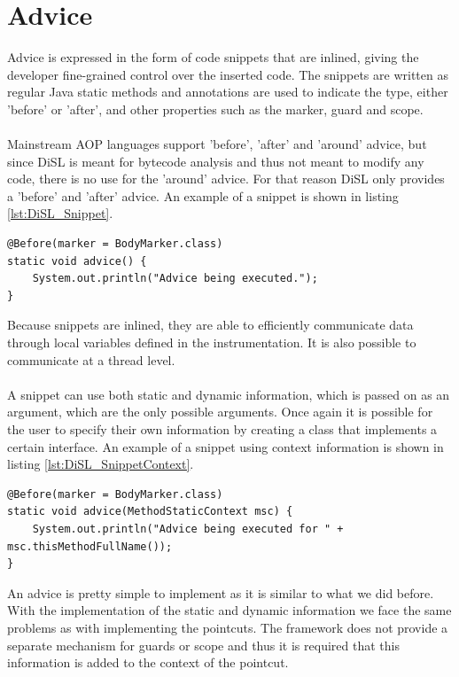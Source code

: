 \documentclass[a4paper]{report}
\begin{document}
\section{Advice}
Advice is expressed in the form of code snippets that are inlined, giving the developer fine-grained control over the inserted code. The snippets are written as regular Java static methods and annotations are used to indicate the type, either 'before' or 'after', and other properties such as the marker, guard and scope.\\
\\
Mainstream AOP languages support 'before', 'after' and 'around' advice, but since DiSL is meant for bytecode analysis and thus not meant to modify any code, there is no use for the 'around' advice. For that reason DiSL only provides a 'before' and 'after' advice. An example of a snippet is shown in listing \ref{lst:DiSL_Snippet}.\\
\begin{lstlisting}[caption=Example of a snippet.,label=lst:DiSL_Snippet]
@Before(marker = BodyMarker.class)
static void advice() {
	System.out.println("Advice being executed.");
}
\end{lstlisting}
Because snippets are inlined, they are able to efficiently communicate data through local variables defined in the instrumentation. It is also possible to communicate at a thread level.\\
\\
A snippet can use both static and dynamic information, which is passed on as an argument, which are the only possible arguments. Once again it is possible for the user to specify their own information by creating a class that implements a certain interface. An example of a snippet using context information is shown in listing \ref{lst:DiSL_SnippetContext}.
\begin{lstlisting}[caption=Example of a snippet using context information.,label=lst:DiSL_SnippetContext]
@Before(marker = BodyMarker.class)
static void advice(MethodStaticContext msc) {
	System.out.println("Advice being executed for " + msc.thisMethodFullName());
}
\end{lstlisting}
An advice is pretty simple to implement as it is similar to what we did before. With the implementation of the static and dynamic information we face the same problems as with implementing the pointcuts. The framework does not provide a separate mechanism for guards or scope and thus it is required that this information is added to the context of the pointcut.
\end{document}
